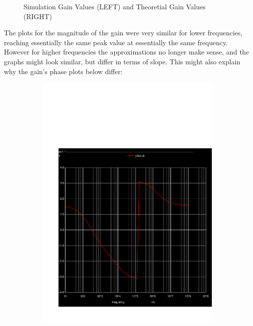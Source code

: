 \begin{figure}[H]
\begin{subfigure}{.55\textwidth}
\end{subfigure}
\caption{Simulation Gain Values (LEFT) and Theoretial Gain Values (RIGHT)}
\label{fig:sbs3}
\end{figure}

The plots for the magnitude of the gain were very similar for lower frequencies, reaching essentially the same peak value at essentially the same frequency. However for higher frequencies the approximations no longer make sense, and the graphs might look similar, but differ in terms of slope. This might also explain why the gain's phase plots below differ:

\begin{figure}[H]
\centering
\begin{subfigure}{.45\textwidth}
  \centering
  \includegraphics[width=0.9\linewidth]{../sim/phase.pdf}
\end{subfigure}%
\begin{subfigure}{.55\textwidth}
  \centering
  \vspace{3cm}

\end{subfigure}
\end{figure}
